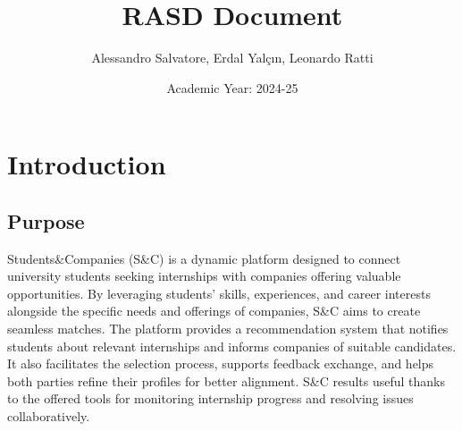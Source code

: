 \documentclass{article}
\begin{document}
\title{RASD Document}
\author{Alessandro Salvatore, Erdal Yalçın, Leonardo Ratti}
\date{Academic Year: 2024-25}
\maketitle

\newpage
\tableofcontents

\newpage
\section{Introduction}
\subsection{Purpose}
Students\&Companies (S\&C) is a dynamic platform designed to connect university students seeking internships with companies offering valuable opportunities. By leveraging students' skills, experiences, and career interests alongside the specific needs and offerings of companies, S\&C aims to create seamless matches. The platform provides a recommendation system that notifies students about relevant internships and informs companies of suitable candidates. It also facilitates the selection process, supports feedback exchange, and helps both parties refine their profiles for better alignment. S\&C results useful thanks to the offered tools for monitoring internship progress and resolving issues collaboratively.
\end{document}

